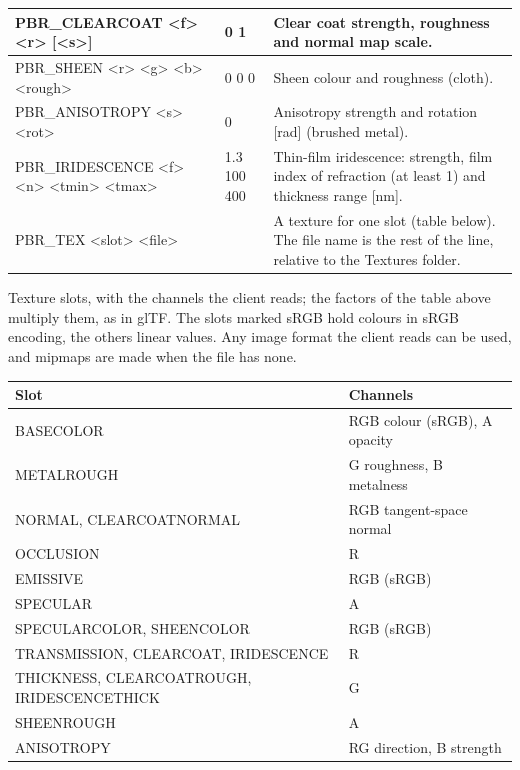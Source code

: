 \documentclass[Orbiter Developer Manual.tex]{subfiles}
\begin{document}
\begin{sloppypar}
\begin{longtable}{ |>{\raggedright\arraybackslash}p{}|>{\raggedright\arraybackslash}p{}|>{\raggedright\arraybackslash}p{}| }
	PBR\_CLEARCOAT <f> <r> [<s>] & 0 0 1 & Clear coat strength, roughness and normal map scale.\\
	\hline\rule{0pt}{2ex}
	PBR\_SHEEN <r> <g> <b> <rough> & 0 0 0 0 & Sheen colour and roughness (cloth).\\
	\hline\rule{0pt}{2ex}
	PBR\_ANISOTROPY <s> <rot> & 0 0 & Anisotropy strength and rotation [rad] (brushed metal).\\
	\hline\rule{0pt}{2ex}
	PBR\_IRIDESCENCE <f> <n> <tmin> <tmax> & 0 1.3 100 400 & Thin-film iridescence: strength, film index of refraction (at least 1) and thickness range [nm].\\
	\hline\rule{0pt}{2ex}
	PBR\_TEX <slot> <file> & & A texture for one slot (table below). The file name is the rest of the line, relative to the Textures folder.\\
	\hline
	\end{longtable}

\noindent
Texture slots, with the channels the client reads; the factors of the table above multiply them, as in glTF. The slots marked sRGB hold colours in sRGB encoding, the others linear values. Any image format the client reads can be used, and mipmaps are made when the file has none.

	\begin{longtable}{ |>{\raggedright\arraybackslash}p{}|p{}| }
	\hline\rule{0pt}{2ex}
	\textbf{Slot} & \textbf{Channels}\\
	\hline\rule{0pt}{2ex}
	BASECOLOR & RGB colour (sRGB), A opacity\\
	\hline\rule{0pt}{2ex}
	METALROUGH & G roughness, B metalness\\
	\hline\rule{0pt}{2ex}
	NORMAL, CLEARCOATNORMAL & RGB tangent-space normal\\
	\hline\rule{0pt}{2ex}
	OCCLUSION & R\\
	\hline\rule{0pt}{2ex}
	EMISSIVE & RGB (sRGB)\\
	\hline\rule{0pt}{2ex}
	SPECULAR & A\\
	\hline\rule{0pt}{2ex}
	SPECULARCOLOR, SHEENCOLOR & RGB (sRGB)\\
	\hline\rule{0pt}{2ex}
	TRANSMISSION, CLEARCOAT, IRIDESCENCE & R\\
	\hline\rule{0pt}{2ex}
	THICKNESS, CLEARCOATROUGH, IRIDESCENCETHICK & G\\
	\hline\rule{0pt}{2ex}
	SHEENROUGH & A\\
	\hline\rule{0pt}{2ex}
	ANISOTROPY & RG direction, B strength\\
	\hline
	\end{longtable}


\end{sloppypar}
\end{document}
